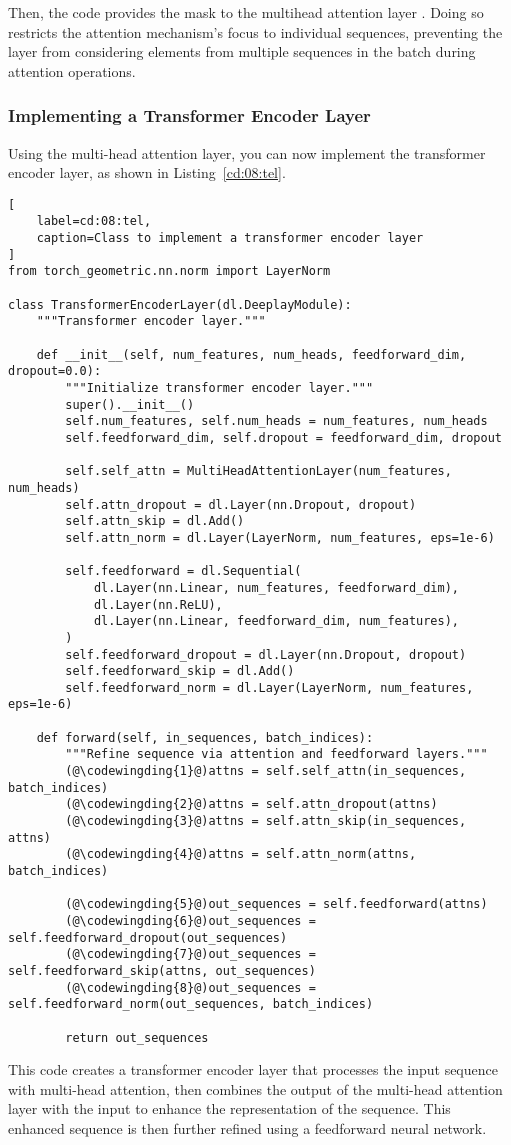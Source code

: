 Then, the code provides the mask to the multihead attention layer . Doing so restricts the attention mechanism's focus to individual sequences, preventing the layer from considering elements from multiple sequences in the batch during attention operations.

\subsubsection{Implementing a Transformer Encoder Layer}

Using the multi-head attention layer, you can now implement the transformer encoder layer, as shown in Listing~\ref{cd:08:tel}.
\begin{lstlisting}[
    label=cd:08:tel,
    caption=Class to implement a transformer encoder layer
]
from torch_geometric.nn.norm import LayerNorm

class TransformerEncoderLayer(dl.DeeplayModule):
    """Transformer encoder layer."""
    
    def __init__(self, num_features, num_heads, feedforward_dim, dropout=0.0):
        """Initialize transformer encoder layer."""
        super().__init__()
        self.num_features, self.num_heads = num_features, num_heads
        self.feedforward_dim, self.dropout = feedforward_dim, dropout

        self.self_attn = MultiHeadAttentionLayer(num_features, num_heads)
        self.attn_dropout = dl.Layer(nn.Dropout, dropout) 
        self.attn_skip = dl.Add() 
        self.attn_norm = dl.Layer(LayerNorm, num_features, eps=1e-6)

        self.feedforward = dl.Sequential(
            dl.Layer(nn.Linear, num_features, feedforward_dim),
            dl.Layer(nn.ReLU),
            dl.Layer(nn.Linear, feedforward_dim, num_features),
        )
        self.feedforward_dropout = dl.Layer(nn.Dropout, dropout) 
        self.feedforward_skip = dl.Add() 
        self.feedforward_norm = dl.Layer(LayerNorm, num_features, eps=1e-6)

    def forward(self, in_sequences, batch_indices):
        """Refine sequence via attention and feedforward layers."""
        (@\codewingding{1}@)attns = self.self_attn(in_sequences, batch_indices)
        (@\codewingding{2}@)attns = self.attn_dropout(attns)
        (@\codewingding{3}@)attns = self.attn_skip(in_sequences, attns)
        (@\codewingding{4}@)attns = self.attn_norm(attns, batch_indices)

        (@\codewingding{5}@)out_sequences = self.feedforward(attns)
        (@\codewingding{6}@)out_sequences = self.feedforward_dropout(out_sequences)
        (@\codewingding{7}@)out_sequences = self.feedforward_skip(attns, out_sequences)
        (@\codewingding{8}@)out_sequences = self.feedforward_norm(out_sequences, batch_indices)
        
        return out_sequences
\end{lstlisting}
This code creates a transformer encoder layer that processes the input sequence with multi-head attention, then combines the output of the multi-head attention layer with the input to enhance the representation of the sequence. This enhanced sequence is then further refined using a feedforward neural network. 

